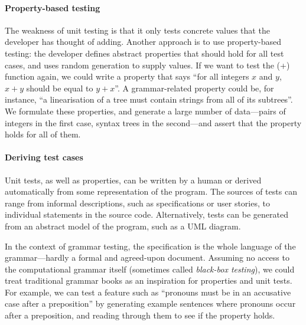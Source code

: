 \paragraph{Property-based testing}

The weakness of unit testing is that it only tests concrete values
that the developer has thought of adding. Another approach is to use
property-based testing: the developer defines abstract properties that
should hold for all test cases, and uses random generation to supply
values. If we want to test the (+) function again, we could write a
property that says ``for all integers $x$ and $y$, $x+y$ should be
equal to $y+x$''.  A grammar-related property could be, for instance,
``a linearisation of a tree must contain strings from all of its
subtrees''.  We formulate these properties, and generate a large
number of data---pairs of integers in the first case, syntax trees in
the second---and assert that the property holds for all of them.



\paragraph{Deriving test cases}

Unit tests, as well as properties, can be written by a human or
derived automatically from some representation of the program. The
sources of tests can range from informal descriptions, such as
specifications or user stories, to individual statements in the source
code. Alternatively, tests can be generated from an abstract model of
the program, such as a UML diagram.

In the context of grammar testing, the specification is the whole
language of the grammar---hardly a formal and agreed-upon
document. Assuming no access to the computational grammar itself
(sometimes called \emph{black-box testing}), we could treat
traditional grammar books as an inspiration for properties and unit
tests. For example, we can test a feature such as ``pronouns must be
in an accusative case after a preposition'' by generating example
sentences where pronouns occur after a preposition, and reading
through them to see if the property holds.

